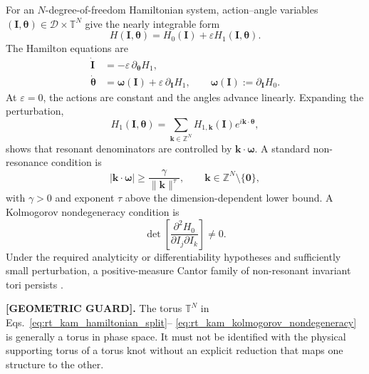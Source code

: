 For an \(N\)-degree-of-freedom Hamiltonian system, action--angle variables
\((\mathbf I,\boldsymbol\theta)\in\mathcal D\times\mathbb T^N\) give the
nearly integrable form
\begin{equation}
    H(\mathbf I,\boldsymbol\theta)
    =
    H_0(\mathbf I)
    +
    \varepsilon H_1(\mathbf I,\boldsymbol\theta).
    \label{eq:rt_kam_hamiltonian_split}
\end{equation}
The Hamilton equations are
\begin{align}
    \dot{\mathbf I}
    &=
    -\varepsilon\,\partial_{\boldsymbol\theta}H_1,
    \\
    \dot{\boldsymbol\theta}
    &=
    \boldsymbol\omega(\mathbf I)
    +
    \varepsilon\,\partial_{\mathbf I}H_1,
    \qquad
    \boldsymbol\omega(\mathbf I)
    :=
    \partial_{\mathbf I}H_0.
    \label{eq:rt_kam_hamilton_equations}
\end{align}
At \(\varepsilon=0\), the actions are constant and the angles advance
linearly.  Expanding the perturbation,
\begin{equation}
    H_1(\mathbf I,\boldsymbol\theta)
    =
    \sum_{\mathbf k\in\mathbb Z^N}
    H_{1,\mathbf k}(\mathbf I)
    e^{i\mathbf k\cdot\boldsymbol\theta},
    \label{eq:rt_kam_fourier_expansion}
\end{equation}
shows that resonant denominators are controlled by
\(\mathbf k\cdot\boldsymbol\omega\).  A standard non-resonance condition is
\begin{equation}
    \left|
    \mathbf k\cdot\boldsymbol\omega
    \right|
    \geq
    \frac{\gamma}{\lVert\mathbf k\rVert^{\tau}},
    \qquad
    \mathbf k\in\mathbb Z^N\setminus\{\mathbf0\},
    \label{eq:rt_kam_diophantine_condition}
\end{equation}
with \(\gamma>0\) and exponent \(\tau\) above the dimension-dependent lower
bound.  A Kolmogorov nondegeneracy condition is
\begin{equation}
    \det
    \left[
    \frac{\partial^2H_0}{\partial I_j\partial I_k}
    \right]
    \neq0.
    \label{eq:rt_kam_kolmogorov_nondegeneracy}
\end{equation}
Under the required analyticity or differentiability hypotheses and sufficiently
small perturbation, a positive-measure Cantor family of non-resonant invariant
tori persists \cite{Kolmogorov1954,Arnold1963KAM,Moser1962InvariantCurves}.

\textbf{[GEOMETRIC GUARD].}
The torus \(\mathbb T^N\) in Eqs.~\eqref{eq:rt_kam_hamiltonian_split}--
\eqref{eq:rt_kam_kolmogorov_nondegeneracy} is generally a torus in phase
space.  It must not be identified with the physical supporting torus of a
torus knot without an explicit reduction that maps one structure to the
other.

